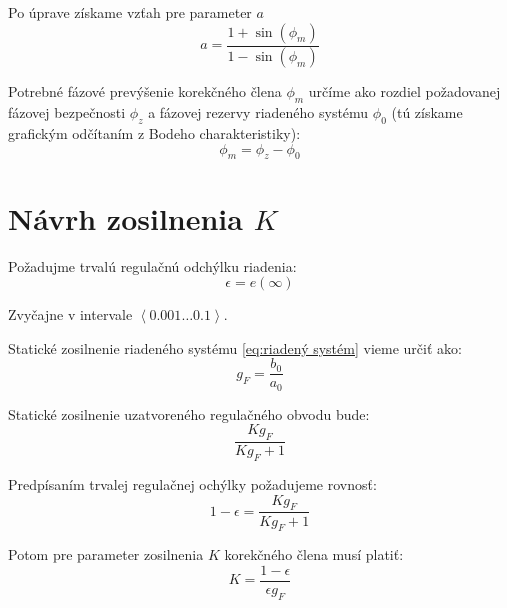 \documentclass[a4paper,10pt]{article}
\begin{document}
Po úprave získame vzťah pre parameter $a$
\begin{equation}
\label{eq:a}
 a=\frac{1+\sin(\phi_m)}{1-\sin(\phi_m)}
\end{equation}

Potrebné fázové prevýšenie korekčného člena $\phi_m$ určíme ako rozdiel požadovanej fázovej bezpečnosti $\phi_z$ a fázovej rezervy riadeného systému $\phi_0$ (tú získame grafickým odčítaním z Bodeho charakteristiky):
\begin{equation}
\label{eq:phi_m}
\phi_m=\phi_z-\phi_0
\end{equation}

\pagebreak

\section{Návrh zosilnenia $K$} 
Požadujme trvalú regulačnú odchýlku riadenia:
\begin{equation}
\epsilon=e(\infty)
\end{equation}

Zvyčajne v intervale $\left<0.001 \ldots 0.1 \right>$.

Statické zosilnenie riadeného systému \eqref{eq:riadený systém} vieme určiť ako:
\begin{equation}
\label{eq:g_F}
g_F=\frac{b_0}{a_0}
\end{equation}

Statické zosilnenie uzatvoreného regulačného obvodu bude:
\begin{equation}
 \frac{K g_F}{K g_F+1}
\end{equation}

Predpísaním trvalej regulačnej ochýlky požadujeme rovnosť:
\begin{equation}
1-\epsilon=\frac{K g_F}{K g_F+1}
\end{equation} 

Potom pre parameter zosilnenia $K$ korekčného člena musí platiť:
\begin{equation}
\label{eq:K}
K=\frac{1-\epsilon}{\epsilon g_F}
\end{equation}
\end{document}
